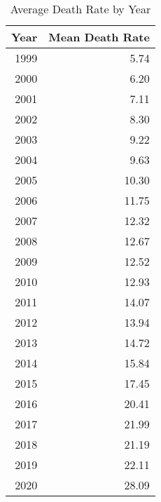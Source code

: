 \begin{table}\centering
\caption{Average Death Rate by Year}
\label{}
\begin{tabular}[t]{r|r}
\hline
Year & Mean Death Rate\\
\hline
1999 & 5.74\\
\hline
2000 & 6.20\\
\hline
2001 & 7.11\\
\hline
2002 & 8.30\\
\hline
2003 & 9.22\\
\hline
2004 & 9.63\\
\hline
2005 & 10.30\\
\hline
2006 & 11.75\\
\hline
2007 & 12.32\\
\hline
2008 & 12.67\\
\hline
2009 & 12.52\\
\hline
2010 & 12.93\\
\hline
2011 & 14.07\\
\hline
2012 & 13.94\\
\hline
2013 & 14.72\\
\hline
2014 & 15.84\\
\hline
2015 & 17.45\\
\hline
2016 & 20.41\\
\hline
2017 & 21.99\\
\hline
2018 & 21.19\\
\hline
2019 & 22.11\\
\hline
2020 & 28.09\\
\hline

\end{tabular}
\end{table}